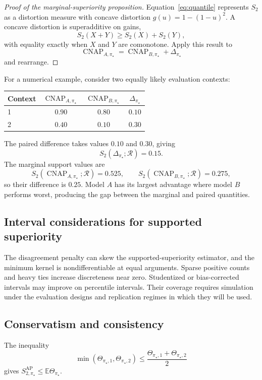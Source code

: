 \documentclass[11pt]{article}
\newcommand{\CNAP}{\operatorname{CNAP}}
\newcommand{\Regime}{\mathcal{R}}
\newcommand{\E}{\mathbb{E}}
\newcommand{\SAP}{S_{2,\pi_\star}^{\mathrm{AP}}}
\theoremstyle{remark}
\begin{document}
\begin{proof}[Proof of the marginal-superiority proposition]
Equation~\eqref{eq:quantile} represents $S_2$ as a distortion measure with concave distortion $g(u)=1-(1-u)^2$. A concave distortion is superadditive on gains,
\[
S_2(X+Y)\geq S_2(X)+S_2(Y),
\]
with equality exactly when $X$ and $Y$ are comonotone. Apply this result to
\[
\CNAP_{A,\pi_\star}
=
\CNAP_{B,\pi_\star}+\Delta_{\pi_\star}
\]
and rearrange.
\end{proof}

For a numerical example, consider two equally likely evaluation contexts:
\begin{center}
\begin{tabular}{@{}lccc@{}}
\toprule
Context & $\CNAP_{A,\pi_\star}$ & $\CNAP_{B,\pi_\star}$ & $\Delta_{\pi_\star}$ \\
\midrule
1 & $0.90$ & $0.80$ & $0.10$ \\
2 & $0.40$ & $0.10$ & $0.30$ \\
\bottomrule
\end{tabular}
\end{center}
The paired difference takes values $0.10$ and $0.30$, giving
\[
S_2(\Delta_{\pi_\star};\Regime)=0.15.
\]
The marginal support values are
\[
S_2(\CNAP_{A,\pi_\star};\Regime)=0.525,
\qquad
S_2(\CNAP_{B,\pi_\star};\Regime)=0.275,
\]
so their difference is $0.25$. Model $A$ has its largest advantage where model $B$ performs worst, producing the gap between the marginal and paired quantities.

\subsection{Interval considerations for supported superiority}
\label{app:superiority-intervals}

The disagreement penalty can skew the supported-superiority estimator, and the minimum kernel is nondifferentiable at equal arguments. Sparse positive counts and heavy ties increase discreteness near zero. Studentized or bias-corrected intervals may improve on percentile intervals. Their coverage requires simulation under the evaluation designs and replication regimes in which they will be used.

\subsection{Conservatism and consistency}

The inequality
\[
\min(\Theta_{\pi_\star,1},\Theta_{\pi_\star,2})
\leq
\frac{\Theta_{\pi_\star,1}+\Theta_{\pi_\star,2}}{2}
\]
gives $\SAP\leq\E\Theta_{\pi_\star}$.
\end{document}
